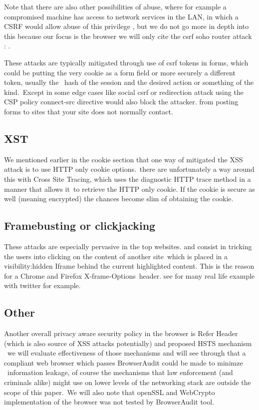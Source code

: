 Note that there are also other possibilities of abuse, where for example a compromised machine has access to network services in the LAN, in which a CSRF would allow abuse
of this privilege , but we do not go more in depth into this because our focus is the browser we will only cite the csrf soho router attack : \cite{soho}.

These attacks are typically mitigated through use of csrf tokens in forms, which could be putting the very cookie as a form field or more securely a different token, usually the \
hash of the session and the desired action or something of the kind.\ Except in some edge cases like social csrf or redirection attack using the CSP policy connect-src directive would also block the attacker.
from posting forms to sites that your site does not normally contact.\\

\subsection{XST}
\label{label:xst}

We mentioned earlier in the cookie section that one way of mitigated the XSS attack is to use HTTP only cookie options.\
there are unfortunately a way around this with Cross Site Tracing, which uses the diagnostic HTTP trace method in a manner that allows it\
to retrieve the HTTP only cookie. If the cookie is secure as well (meaning encrypted) the chances become slim of obtaining the cookie.\


\subsection{Framebusting or clickjacking}

These attacks are especially pervasive in the top websites. and consist in tricking the users into clicking on the content of another site\
which is placed in a visibility:hidden Iframe behind the current highlighted content. This is the reason for a Chrome and Firefox X-frame-Options\
header. see \cite{buster} for many real life example with twitter for example.

\subsection{Other}

Another overall privacy aware security policy in the browser is Refer Header (which is also source of XSS attacks potentially) and proposed HSTS mechanism \
we will evaluate effectiveness of those mechanisms and will see through that a compliant web browser which passes BrowserAudit could be made to minimze \
information leakage, of course the mechanisms that law enforcement (and criminals alike) might use on lower levels of the networking stack are outside the scope of this paper.\
We will also note that openSSL and WebCrypto implementation of the browser was not tested by BrowserAudit tool.\


